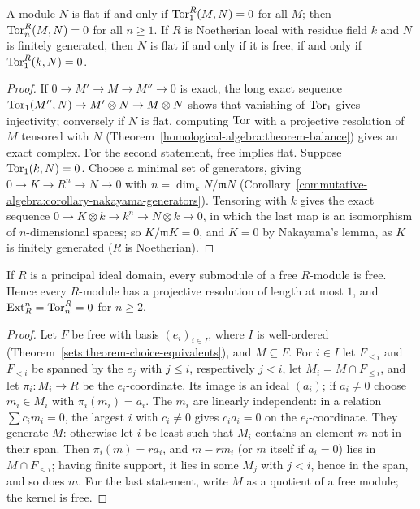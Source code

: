 \begin{proposition}\label{homological-algebra:proposition-flat-tor}
A module $N$ is flat if and only if $\operatorname{Tor}_1^R(M, N) = 0$ for all $M$; then $\operatorname{Tor}_n^R(M, N) = 0$ for all $n \geq 1$. If $R$ is
Noetherian local with residue field $k$ and $N$ is finitely generated, then $N$ is flat if and only if it is free, if and only if
$\operatorname{Tor}_1^R(k, N) = 0$.
\end{proposition}

\begin{proof}
If $0 \to M' \to M \to M'' \to 0$ is exact, the long exact sequence
$\operatorname{Tor}_1(M'', N) \to M' \otimes N \to M \otimes N$ shows that vanishing of $\operatorname{Tor}_1$ gives injectivity; conversely if $N$ is flat,
computing $\operatorname{Tor}$ with a projective resolution of $M$ tensored with $N$ (Theorem~\ref{homological-algebra:theorem-balance})
gives an exact complex. For the second statement, free implies flat. Suppose $\operatorname{Tor}_1(k, N) = 0$. Choose a minimal set of
generators, giving $0 \to K \to R^n \to N \to 0$ with $n = \dim_k N/\mathfrak{m}N$
(Corollary~\ref{commutative-algebra:corollary-nakayama-generators}). Tensoring with $k$ gives the exact sequence
$0 \to K \otimes k \to k^n \to N \otimes k \to 0$, in which the last map is an isomorphism of $n$-dimensional spaces; so
$K/\mathfrak{m}K = 0$, and $K = 0$ by Nakayama's lemma, as $K$ is finitely generated ($R$ is Noetherian).
\end{proof}

\begin{proposition}\label{homological-algebra:proposition-pid-submodules-free}
If $R$ is a principal ideal domain, every submodule of a free $R$-module is free. Hence every $R$-module has a projective
resolution of length at most $1$, and $\operatorname{Ext}^n_R = \operatorname{Tor}_n^R = 0$ for $n \geq 2$.
\end{proposition}

\begin{proof}
Let $F$ be free with basis $(e_i)_{i \in I}$, where $I$ is well-ordered (Theorem~\ref{sets:theorem-choice-equivalents}), and
$M \subseteq F$. For $i \in I$ let $F_{\leq i}$ and $F_{<i}$ be spanned by the $e_j$ with $j \leq i$, respectively $j < i$, let
$M_i = M \cap F_{\leq i}$, and let $\pi_i \colon M_i \to R$ be the $e_i$-coordinate. Its image is an ideal $(a_i)$; if $a_i \neq 0$ choose
$m_i \in M_i$ with $\pi_i(m_i) = a_i$. The $m_i$ are linearly independent: in a relation $\sum c_im_i = 0$, the largest $i$ with
$c_i \neq 0$ gives $c_ia_i = 0$ on the $e_i$-coordinate. They generate $M$: otherwise let $i$ be least such that $M_i$ contains an
element $m$ not in their span. Then $\pi_i(m) = ra_i$, and $m - rm_i$ (or $m$ itself if $a_i = 0$) lies in $M \cap F_{<i}$; having
finite support, it lies in some $M_j$ with $j < i$, hence in the span, and so does $m$. For the last statement, write $M$ as a
quotient of a free module; the kernel is free.
\end{proof}

